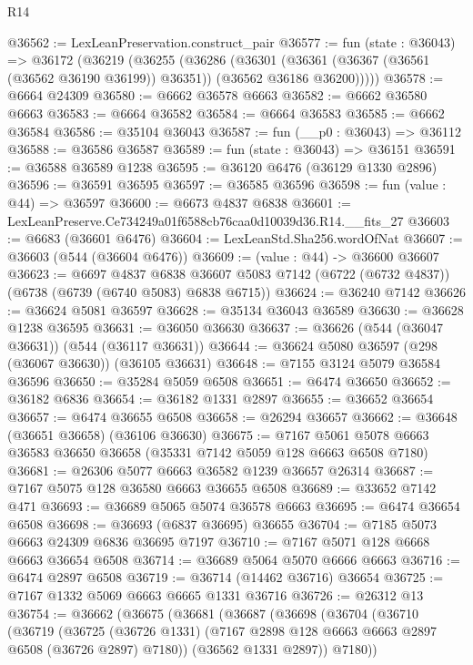 \begin{lexlean}{R14}
\begin{coremodule}
@36562 := LexLeanPreservation.construct_pair
@36577 := fun (state : @36043) =>
  @36172
    (@36219
      (@36255
        (@36286
          (@36301
            (@36361 (@36367 (@36561 (@36562 @36190 @36199)) @36351))
            (@36562 @36186 @36200)))))
@36578 := @6664 @24309
@36580 := @6662 @36578 @6663
@36582 := @6662 @36580 @6663
@36583 := @6664 @36582
@36584 := @6664 @36583
@36585 := @6662 @36584
@36586 := @35104 @36043
@36587 := fun (__p0 : @36043) => @36112
@36588 := @36586 @36587
@36589 := fun (state : @36043) => @36151
@36591 := @36588 @36589 @1238
@36595 := @36120 @6476 (@36129 @1330 @2896)
@36596 := @36591 @36595
@36597 := @36585 @36596
@36598 := fun (value : @44) => @36597
@36600 := @6673 @4837 @6838
@36601 := LexLeanPreserve.Ce734249a01f6588cb76caa0d10039d36.R14.__fits_27
@36603 := @6683 (@36601 @6476)
@36604 := LexLeanStd.Sha256.wordOfNat
@36607 := @36603 (@544 (@36604 @6476))
@36609 := (value : @44) -> @36600 @36607
@36623 := @6697
    @4837
    @6838
    @36607
    @5083
    @7142
    (@6722 (@6732 @4837))
    (@6738 (@6739 (@6740 @5083) @6838 @6715))
@36624 := @36240 @7142
@36626 := @36624 @5081 @36597
@36628 := @35134 @36043 @36589
@36630 := @36628 @1238 @36595
@36631 := @36050 @36630
@36637 := @36626 (@544 (@36047 @36631)) (@544 (@36117 @36631))
@36644 := @36624 @5080 @36597 (@298 (@36067 @36630)) (@36105 @36631)
@36648 := @7155 @3124 @5079 @36584 @36596
@36650 := @35284 @5059 @6508
@36651 := @6474 @36650
@36652 := @36182 @6836
@36654 := @36182 @1331 @2897
@36655 := @36652 @36654
@36657 := @6474 @36655 @6508
@36658 := @26294 @36657
@36662 := @36648 (@36651 @36658) (@36106 @36630)
@36675 := @7167 @5061 @5078 @6663 @36583 @36650 @36658 (@35331 @7142 @5059 @128 @6663 @6508 @7180)
@36681 := @26306 @5077 @6663 @36582 @1239 @36657 @26314
@36687 := @7167 @5075 @128 @36580 @6663 @36655 @6508
@36689 := @33652 @7142 @471
@36693 := @36689 @5065 @5074 @36578 @6663
@36695 := @6474 @36654 @6508
@36698 := @36693 (@6837 @36695) @36655
@36704 := @7185 @5073 @6663 @24309 @6836 @36695 @7197
@36710 := @7167 @5071 @128 @6668 @6663 @36654 @6508
@36714 := @36689 @5064 @5070 @6666 @6663
@36716 := @6474 @2897 @6508
@36719 := @36714 (@14462 @36716) @36654
@36725 := @7167 @1332 @5069 @6663 @6665 @1331 @36716
@36726 := @26312 @13
@36754 := @36662
    (@36675
      (@36681
        (@36687
          (@36698
            (@36704
              (@36710
                (@36719
                  (@36725
                    (@36726 @1331)
                    (@7167 @2898 @128 @6663 @6663 @2897 @6508 (@36726 @2897) @7180))
                  (@36562 @1331 @2897))
                @7180))

\end{coremodule}
\end{lexlean}
